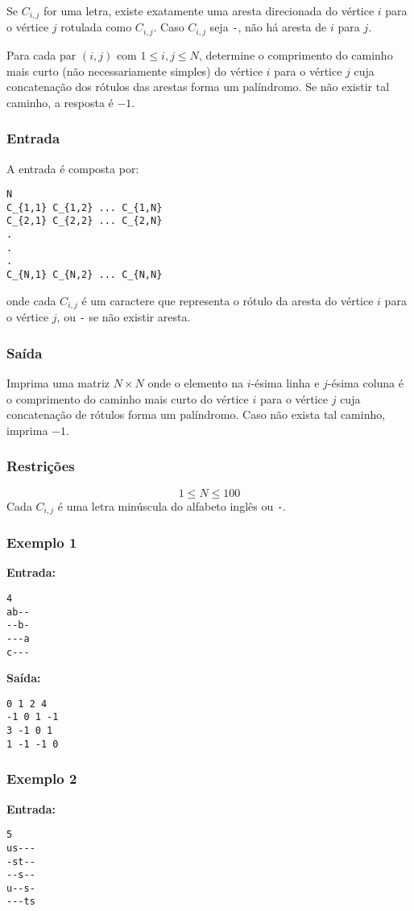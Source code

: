 Se \(C_{i,j}\) for uma letra, existe exatamente uma aresta direcionada do vértice \(i\) para o vértice \(j\) rotulada como \(C_{i,j}\). Caso \(C_{i,j}\) seja \texttt{-}, não há aresta de \(i\) para \(j\).

Para cada par \((i, j)\) com \(1 \le i, j \le N\), determine o comprimento do caminho mais curto (não necessariamente simples) do vértice \(i\) para o vértice \(j\) cuja concatenação dos rótulos das arestas forma um palíndromo. Se não existir tal caminho, a resposta é \(-1\).

\subsubsection*{Entrada}
A entrada é composta por:
\begin{verbatim}
N
C_{1,1} C_{1,2} ... C_{1,N}
C_{2,1} C_{2,2} ... C_{2,N}
.
.
.
C_{N,1} C_{N,2} ... C_{N,N}
\end{verbatim}
onde cada \(C_{i,j}\) é um caractere que representa o rótulo da aresta do vértice \(i\) para o vértice \(j\), ou \texttt{-} se não existir aresta.

\subsubsection*{Saída}
Imprima uma matriz \(N \times N\) onde o elemento na \(i\)-ésima linha e \(j\)-ésima coluna é o comprimento do caminho mais curto do vértice \(i\) para o vértice \(j\) cuja concatenação de rótulos forma um palíndromo. Caso não exista tal caminho, imprima \(-1\).

\subsubsection*{Restrições}
\[
1 \le N \le 100
\]
Cada \(C_{i,j}\) é uma letra minúscula do alfabeto inglês ou \texttt{-}.

\subsubsection*{Exemplo 1}
\textbf{Entrada:}
\begin{verbatim}
4
ab--
--b-
---a
c---
\end{verbatim}

\textbf{Saída:}
\begin{verbatim}
0 1 2 4
-1 0 1 -1
3 -1 0 1
1 -1 -1 0
\end{verbatim}

\subsubsection*{Exemplo 2}
\textbf{Entrada:}
\begin{verbatim}
5
us---
-st--
--s--
u--s-
---ts
\end{verbatim}

